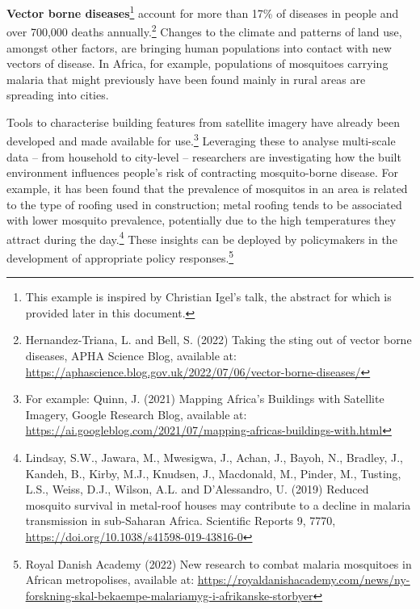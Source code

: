 \textbf{Vector borne diseases}\footnote{This example is inspired by
  Christian Igel's talk, the abstract for which is provided later in
  this document.} account for more than 17\% of diseases in people and
over 700,000 deaths annually.\footnote{Hernandez-Triana, L. and Bell, S.
  (2022) Taking the sting out of vector borne diseases, APHA Science
  Blog, available at:
  \href{https://aphascience.blog.gov.uk/2022/07/06/vector-borne-diseases/}{\uline{https://aphascience.blog.gov.uk/2022/07/06/vector-borne-diseases/}}}
Changes to the climate and patterns of land use, amongst other factors,
are bringing human populations into contact with new vectors of disease.
In Africa, for example, populations of mosquitoes carrying malaria that
might previously have been found mainly in rural areas are spreading
into cities.

Tools to characterise building features from satellite imagery have
already been developed and made available for use.\footnote{For example:
  Quinn, J. (2021) Mapping Africa's Buildings with Satellite Imagery,
  Google Research Blog, available at:
  \href{https://ai.googleblog.com/2021/07/mapping-africas-buildings-with.html}{\uline{https://ai.googleblog.com/2021/07/mapping-africas-buildings-with.html}}}
Leveraging these to analyse multi-scale data -- from household to
city-level -- researchers are investigating how the built environment
influences people's risk of contracting mosquito-borne disease. For
example, it has been found that the prevalence of mosquitos in an area
is related to the type of roofing used in construction; metal roofing
tends to be associated with lower mosquito prevalence, potentially due
to the high temperatures they attract during the day.\footnote{Lindsay,
  S.W., Jawara, M., Mwesigwa, J., Achan, J., Bayoh, N., Bradley, J.,
  Kandeh, B., Kirby, M.J., Knudsen, J., Macdonald, M., Pinder, M.,
  Tusting, L.S., Weiss, D.J., Wilson, A.L. and D'Alessandro, U. (2019)
  Reduced mosquito survival in metal-roof houses may contribute to a
  decline in malaria transmission in sub-Saharan Africa. Scientific
  Reports 9, 7770,
  \href{https://doi.org/10.1038/s41598-019-43816-0}{\uline{https://doi.org/10.1038/s41598-019-43816-0}}}
These insights can be deployed by policymakers in the development of
appropriate policy responses.\footnote{Royal Danish Academy (2022) New
  research to combat malaria mosquitoes in African metropolises,
  available at:
  \href{https://royaldanishacademy.com/news/ny-forskning-skal-bekaempe-malariamyg-i-afrikanske-storbyer}{\uline{https://royaldanishacademy.com/news/ny-forskning-skal-bekaempe-malariamyg-i-afrikanske-storbyer}}}

